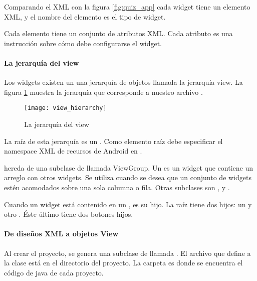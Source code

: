 Comparando el XML con la figura \ref{fig:quiz_app} cada widget tiene un elemento XML, y el
nombre del elemento es el tipo de widget.

Cada elemento tiene un conjunto de atributos XML. Cada atributo es una instrucción
sobre cómo debe configurarse el widget.


\paragraph{La jerarquía del view}
\label{\detokenize{dev_docs:la-jerarquia-del-view}}
Los widgets existen un una jerarquía de objetos  llamada la jerarquía
view. La figura \ref{fig:view_h} muestra la jerarquía que corresponde a nuestro archivo
.

\begin{figure}
    \centering
    \texttt{[image: view\_hierarchy]}
    \caption{La jerarquía del view}
    \label{fig:view_h}
\end{figure}

La raíz de esta jerarquía es un . Como elemento raíz debe especificar
el namespace XML de recursos de Android en .

 hereda de una subclase de  llamada ViewGroup. Un  es un
widget que contiene un arreglo con otros widgets. Se utiliza  cuando
se desea que un conjunto de widgets estén acomodados sobre una sola columna
o fila. Otras subclases  son ,  y .

Cuando un widget está contenido en un , es su hijo. La raíz
 tiene dos hijos: un  y otro . Éste último
tiene dos botones hijos.


\paragraph{De diseños XML a objetos View}
\label{\detokenize{dev_docs:de-disenos-xml-a-objetos-view}}
Al crear el proyecto, se genera una subclase de  llamada
. El archivo que define a la clase está en el directorio  del
proyecto. La carpeta  es donde se encuentra el código de java de cada
proyecto.

